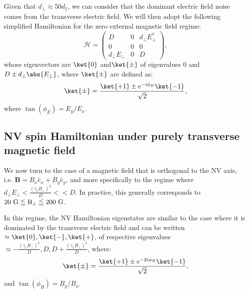\documentclass[a4paper, 11pt]{report}
\begin{document}
Given that $d_\perp \approx 50 d_\parallel$, we can consider that the dominant electric field noise comes from the transverse electric field. We will then adopt the following simplified Hamiltonian for the zero external magnetic field regime:
\begin{equation}
\mathcal{H}=\begin{pmatrix}
D&0&d_\perp E_\perp^* \\
0&0&0 \\
d_\perp E_\perp &0&D
\end{pmatrix},
\end{equation}
whose eigenvectors are $\ket{0}$ and$\ket{\pm}$ of eigenvalues 0 and $D\pm d_\perp \abs{E_\perp}$, where $\ket{\pm}$ are defined as:
\begin{equation}
\ket{\pm}=\frac{\ket{+1}\pm e^{-i\phi_E}\ket{-1}}{\sqrt{2}},
\end{equation}
where $\tan(\phi_E)=E_y/E_x$.

\subsection{NV spin Hamiltonian under purely transverse magnetic field}
\label{sec B transverse}

We now turn to the case of a magnetic field that is orthogonal to the NV axis, i.e. $\mathbf{B}=B_x \hat{e}_x + B_y \hat e_y$, and more specifically to the regime where $d_\perp E_\perp < \frac{(\gamma_e B_\perp)^2}{D} << D$. In practice, this generally corresponds to $20\ \rm G \lesssim B_\perp \lesssim 200\ \rm G$.

In this regime, the NV Hamiltonian eigenstates are similar to the case where it is dominated by the transverse electric field and can be written $\approx \ket{0}, \ket{-}, \ket{+}$\citep{qiu2021nuclear, qiu2022nanoscale}, of respective eigenvalues $\approx -\frac{(\gamma_e B_\perp)^2}{D},D,D+\frac{(\gamma_e B_\perp)^2}{D}$,  where:
\begin{equation}
\ket{\pm}=\frac{\ket{+1}\pm e^{-2i\phi_B}\ket{-1}}{\sqrt{2}},
\end{equation}
and $\tan(\phi_B)=B_y/B_x$.
\end{document}
